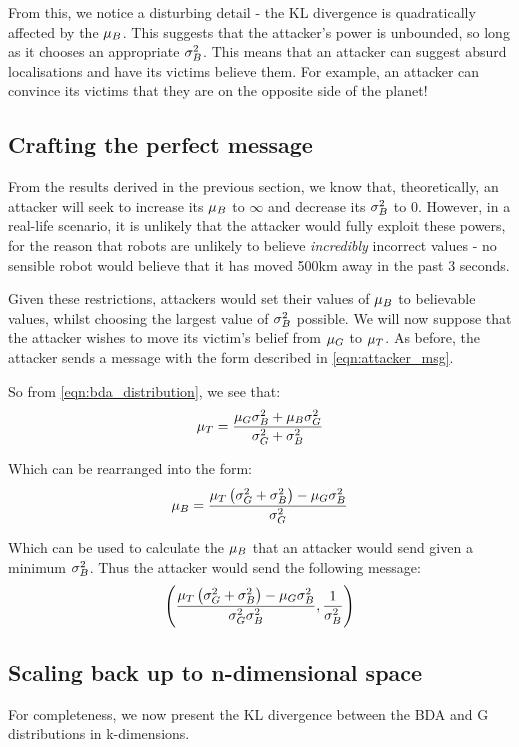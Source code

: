 From this, we notice a disturbing detail - the KL divergence is quadratically affected by the $\mu_B$. This suggests that the attacker's power is unbounded, so long as it chooses an appropriate $\sigma_B^2$. This means that an attacker can suggest absurd localisations and have its victims believe them. For example, an attacker can convince its victims that they are on the opposite side of the planet!

\subsection{Crafting the perfect message}
From the results derived in the previous section, we know that, theoretically, an attacker will seek to increase its $\mu_B$ to $\infty$ and decrease its $\sigma_B^2$ to 0. However, in a real-life scenario, it is unlikely that the attacker would fully exploit these powers, for the reason that robots are unlikely to believe \textit{incredibly} incorrect values - no sensible robot would believe that it has moved 500km away in the past 3 seconds.

Given these restrictions, attackers would set their values of $\mu_B$ to believable values, whilst choosing the largest value of $\sigma_B^2$ possible. 
We will now suppose that the attacker wishes to move its victim's belief from $\mu_G$ to $\mu_T$.
As before, the attacker sends a message with the form described in \autoref{eqn:attacker_msg}.

So from \autoref{eqn:bda_distribution}, we see that:
\begin{equation}
	\mu_T = \frac{\mu_G\sigma_B^2 + \mu_B\sigma_G^2}{\sigma_G^2 + \sigma_B^2}
\end{equation}

Which can be rearranged into the form:
\begin{equation}
	\mu_B = \frac{\mu_T\left(\sigma_G^2 + \sigma_B^2\right) - \mu_G\sigma_B^2}{\sigma_G^2}
\end{equation}

Which can be used to calculate the $\mu_B$ that an attacker would send given a minimum $\sigma_B^2$. 
Thus the attacker would send the following message:
\begin{equation}
	\left(\frac{\mu_T\left(\sigma_G^2 + \sigma_B^2\right) - \mu_G\sigma_B^2}{\sigma_G^2\sigma_B^2}, \frac{1}{\sigma_B^2}\right)
\end{equation}

\subsection{Scaling back up to n-dimensional space}
For completeness, we now present the KL divergence between the BDA and G distributions in k-dimensions.

